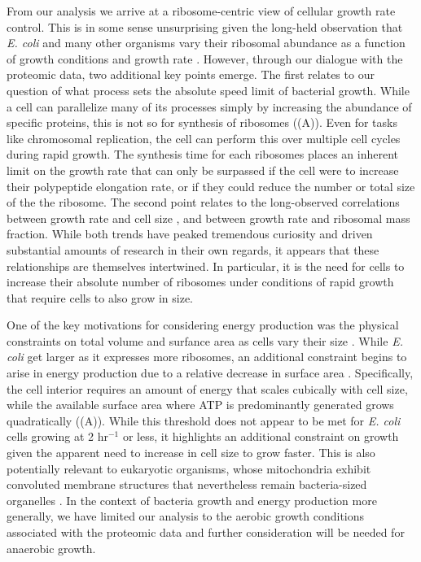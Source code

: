 From our analysis we arrive at a ribosome-centric view of cellular growth rate
control. This is in some sense unsurprising given the long-held observation that
\textit{E. coli} and many other organisms  vary their ribosomal abundance as a
function of growth conditions and growth rate \cite{scott2010, metzlraz2017}.
However, through our dialogue with the proteomic data, two additional key points
emerge. The first relates to our question of what process sets the absolute
speed limit of  bacterial growth. While a cell can parallelize many of its
processes simply by increasing the abundance of specific proteins, this is not
so for synthesis of ribosomes ((A)).  Even for tasks like
chromosomal replication, the cell can perform this over multiple  cell cycles
during rapid growth. The synthesis time for each ribosomes places an inherent
limit on the growth rate that can only be surpassed if the cell were to increase
their polypeptide elongation rate, or if they could reduce the number or total
size of the the ribosome. The second point relates to the long-observed
correlations between growth rate and cell size \citep{schaechter1958, si2017},
and between growth rate and ribosomal mass fraction. While both trends have
peaked tremendous curiosity and driven substantial amounts of research in their
own regards, it appears that these relationships are themselves intertwined. In
particular, it is the need for cells to increase their absolute number of
ribosomes under conditions of rapid growth that require cells to also grow in
size.

One of the key motivations for considering energy production was the physical
constraints on total volume and surfance area as cells vary their size
\citep{harris2016, ojkic2019}. While \textit{E. coli} get larger as it expresses
more ribosomes,  an additional constraint begins to arise in energy production
due to a relative decrease in  surface area \citep{szenk2017}. Specifically, the
cell interior requires an amount of energy that scales cubically with cell size,
while the available surface area where ATP is predominantly generated grows
quadratically ((A)). While this threshold does not appear to
be met for \textit{E. coli} cells growing at 2 hr$^{-1}$ or less, it highlights
an additional constraint on growth given the apparent need to increase in cell
size to grow faster. This is also potentially relevant to eukaryotic organisms,
whose  mitochondria exhibit convoluted membrane structures that nevertheless
remain bacteria-sized  organelles \citep{guo2018}. In the context of bacteria
growth and energy production more generally, we have limited our analysis to the
aerobic growth conditions associated with the proteomic data and further
consideration will be needed for anaerobic growth.

